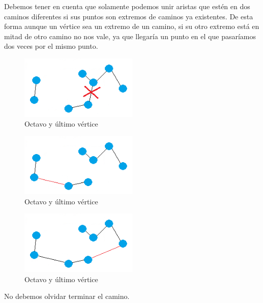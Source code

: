 \vspace{0.5cm}

Debemos tener en cuenta que solamente podemos unir aristas que estén en dos caminos diferentes si sus puntos son extremos de caminos ya existentes. De esta forma aunque un vértice sea un extremo de un camino, si su otro extremo está en mitad de otro camino no nos vale, ya que llegaría un punto en el que pasaríamos dos veces por el mismo punto.

\begin{figure}[htbH] 
	\centering
	\includegraphics[width=0.5\textwidth]{./Imagenes/arista6fail.png}
	\caption{Octavo y último vértice} 
\end{figure}

\vspace{0.5cm}
\begin{figure}[htbH] 
	\centering
	\includegraphics[width=0.5\textwidth]{./Imagenes/arista7.png}
	\caption{Octavo y último vértice} 
\end{figure}

\vspace{0.5cm}
\begin{figure}[htbH] 
	\centering
	\includegraphics[width=0.5\textwidth]{./Imagenes/arista8.png}
	\caption{Octavo y último vértice} 
\end{figure}

No debemos olvidar terminar el camino.

